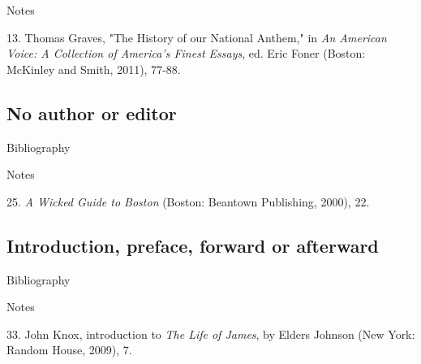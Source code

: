 \begin{center}{Notes}\end{center} 

\begin{singlespace}
\noindent\hspace{1.2cm}13. Thomas Graves, "The
History of our National Anthem," in \emph{An American Voice: A Collection of
America's Finest Essays}, ed. Eric Foner (Boston: McKinley and Smith, 2011),
77-88.
\end{singlespace}
\subsection{No author or editor}

\begin{center}{Bibliography}\end{center}

\begin{singlespace}
\noindent{}
\end{singlespace}


\begin{center}{Notes}\end{center} 
\begin{singlespace}
\noindent\hspace{1.2cm}25. \emph{A Wicked Guide to Boston} (Boston: Beantown Publishing, 2000), 22.
\end{singlespace}


\subsection{Introduction, preface, forward or afterward}
\begin{center}{Bibliography}\end{center} 

\begin{singlespace}
\noindent{}
\end{singlespace}


\begin{center}{Notes}\end{center} 
\begin{singlespace}
\noindent\hspace{1.2cm}33. John Knox,
introduction to \emph{The Life of James}, by Elders Johnson (New York: Random
House, 2009), 7.
\end{singlespace}


